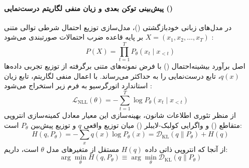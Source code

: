 \paragraph*{پیش‌بینی توکن بعدی و زیان منفی لگاریتم درست‌نمایی ()}
در مدل‌های زبانی خودبازگشتی ()، مدل‌سازی توزیع احتمال شرطی توالی متنی $X = (x_1, x_2, \dots, x_T)$ بر پایه قاعده ضرب احتمالات صورتبندی می‌شود \cite{ciampiconi2024survey, terven2025comprehensive, gan2026beyond}:
\begin{equation}
    P(X) = \prod_{t=1}^T P_\theta(x_t \mid x_{<t})
\end{equation}
اصل برآورد بیشینه‌احتمال () با فرض نمونه‌های متنی برگرفته از توزیع تجربی داده‌ها $q(x)$، تابع درست‌نمایی را به حداکثر می‌رساند. با اعمال منفی لگاریتم، تابع زیان استاندارد اتورگرسیو به فرم زیر استخراج می‌شود \cite{xiao2024survey, terven2025comprehensive}:
\begin{equation}
    \mathcal{L}_{\text{NLL}}(\theta) = - \sum_{t=1}^T \log P_\theta(x_t \mid x_{<t})
\end{equation}
از منظر تئوری اطلاعات شانون، بهینه‌سازی این معیار معادل کمینه‌سازی انتروپی متقاطع () و واگرایی کولبک-لایبلر () میان توزیع واقعی $q$ و توزیع پیش‌بین $P_\theta$ است:
\begin{equation}
    H(q, P_\theta) = - \sum_{x} q(x) \log P_\theta(x) = \mathcal{D}_{\text{KL}}(q \parallel P_\theta) + H(q)
\end{equation}
از آنجا که انتروپی ذاتی داده $H(q)$ مستقل از متغیرهای مدل $\theta$ است، داریم:
\begin{equation}
    \arg\min_\theta H(q, P_\theta) \equiv \arg\min_\theta \mathcal{D}_{\text{KL}}(q \parallel P_\theta)
\end{equation}

